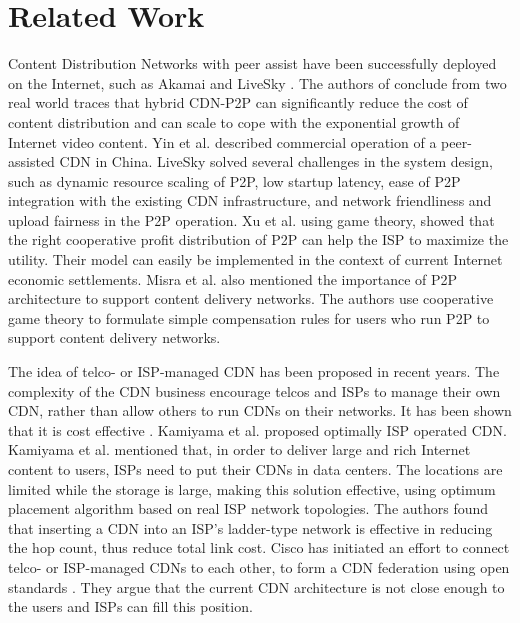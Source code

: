 \documentclass[JIP]{ipsj}
\begin{document}
\section{Related Work} 

Content Distribution Networks with peer assist have been successfully deployed on the Internet, such as Akamai \cite{Huang:2008:UHC:1496046.1496064} and LiveSky \cite{Yin:2010:LEC:1823746.1823750}.  
The authors of \cite{Huang:2008:UHC:1496046.1496064} conclude from two real world traces that hybrid CDN-P2P can significantly reduce the cost of content distribution and can scale to cope with the exponential growth of Internet video content.  
Yin et al. \cite{Yin:2010:LEC:1823746.1823750} described commercial operation of a peer-assisted CDN in China.  
LiveSky solved several challenges in the system design, such as dynamic resource scaling of P2P, low startup latency, ease of P2P integration with the existing CDN infrastructure, and network friendliness and upload fairness in the P2P operation.  
Xu et al.\cite{DBLP:journals/corr/abs-1212-4915} using game theory, showed that the right cooperative profit distribution of P2P can help the ISP to maximize the utility.  
Their model can easily be implemented in the context of current Internet economic settlements.  
Misra et al.\cite{Misra:2010:IPS:1811099.1811064} also mentioned the importance of P2P architecture to support content delivery networks.
The authors use cooperative game theory to formulate simple compensation rules for users who run P2P to support content delivery networks.

The idea of telco- or ISP-managed CDN has been proposed in recent years.  
The complexity of the CDN business encourage telcos and ISPs to manage their own CDN, rather than allow others to run CDNs on their networks.  
It has been shown that it is cost effective \cite{federation}\cite{norton2011internet}. 
Kamiyama et al. \cite{NoriakiKAMIYAMA2013} proposed optimally ISP operated CDN.
Kamiyama et al. mentioned that, in order to deliver large and rich Internet content to users, ISPs need to put their CDNs in data centers.  
The locations are limited while the storage is large, making this solution effective, using optimum placement algorithm based on real ISP network topologies.  
The authors found that inserting a CDN into an ISP's ladder-type network is effective in reducing the hop count, thus reduce total link cost.  
Cisco has initiated an effort to connect telco- or ISP-managed CDNs to each other, to form a CDN federation \cite{federation} using open standards \cite{cdni}.  
They argue that the current CDN architecture is not close enough to the users and ISPs can fill this position.
\end{document}
